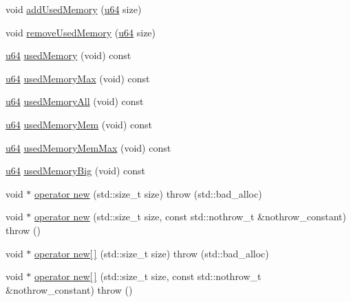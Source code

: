 \begin{DoxyCompactItemize}
\item 
void \hyperlink{classcrap_1_1_memory_tracker_a8fef331c83bae77fb2d24c75d94384a1}{add\-Used\-Memory} (\hyperlink{types_8h_a3f7e2bcbb0b4c338f3c4f6c937cd4234}{u64} size)
\item 
void \hyperlink{classcrap_1_1_memory_tracker_af9205749a325944636967faf56fbf638}{remove\-Used\-Memory} (\hyperlink{types_8h_a3f7e2bcbb0b4c338f3c4f6c937cd4234}{u64} size)
\item 
\hyperlink{types_8h_a3f7e2bcbb0b4c338f3c4f6c937cd4234}{u64} \hyperlink{classcrap_1_1_memory_tracker_a684b98c04f08059b67b17d7946a5c412}{used\-Memory} (void) const 
\item 
\hyperlink{types_8h_a3f7e2bcbb0b4c338f3c4f6c937cd4234}{u64} \hyperlink{classcrap_1_1_memory_tracker_ab4f0406dea8cf0ab17d448677ab4400c}{used\-Memory\-Max} (void) const 
\item 
\hyperlink{types_8h_a3f7e2bcbb0b4c338f3c4f6c937cd4234}{u64} \hyperlink{classcrap_1_1_memory_tracker_a2e6b37d620876ea8b2ca687b3fdf085e}{used\-Memory\-All} (void) const 
\item 
\hyperlink{types_8h_a3f7e2bcbb0b4c338f3c4f6c937cd4234}{u64} \hyperlink{classcrap_1_1_memory_tracker_a1967fa5a6d36f83438dd883cbead029f}{used\-Memory\-Mem} (void) const 
\item 
\hyperlink{types_8h_a3f7e2bcbb0b4c338f3c4f6c937cd4234}{u64} \hyperlink{classcrap_1_1_memory_tracker_abd3ad336e094c04f5a3de028a954e285}{used\-Memory\-Mem\-Max} (void) const 
\item 
\hyperlink{types_8h_a3f7e2bcbb0b4c338f3c4f6c937cd4234}{u64} \hyperlink{classcrap_1_1_memory_tracker_ac7dd8238a2243b5635c6ce8d754b5deb}{used\-Memory\-Big} (void) const 
\item 
void $\ast$ \hyperlink{classcrap_1_1_memory_tracker_a7d51f1f0e495e0a3ca3f05fb55436e45}{operator new} (std\-::size\-\_\-t size)  throw (std\-::bad\-\_\-alloc)
\item 
void $\ast$ \hyperlink{classcrap_1_1_memory_tracker_a31373cb2faa569c6d149c44edd1a9bea}{operator new} (std\-::size\-\_\-t size, const std\-::nothrow\-\_\-t \&nothrow\-\_\-constant)  throw ()
\item 
void $\ast$ \hyperlink{classcrap_1_1_memory_tracker_afe4a30ff401a1f7422591bebeea5e277}{operator new\mbox{[}$\,$\mbox{]}} (std\-::size\-\_\-t size)  throw (std\-::bad\-\_\-alloc)
\item 
void $\ast$ \hyperlink{classcrap_1_1_memory_tracker_a35a34626f8813a33123be2cebb234c63}{operator new\mbox{[}$\,$\mbox{]}} (std\-::size\-\_\-t size, const std\-::nothrow\-\_\-t \&nothrow\-\_\-constant)  throw ()

\end{DoxyCompactItemize}
